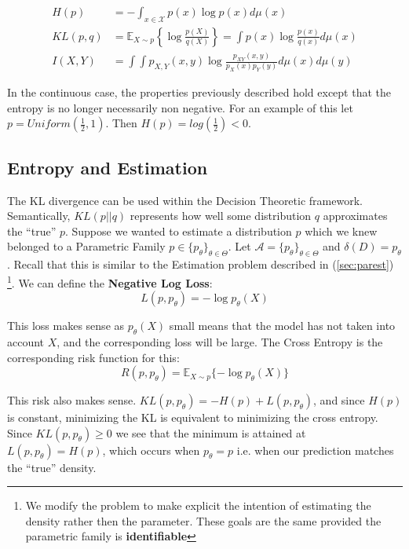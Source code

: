 \documentclass[]{article}
\theoremstyle{mattstyle}
\theoremstyle{definition}
\begin{document}
\begin{align}
H(p) &= -\int_{x\in\mathcal{X}}p(x)\log p(x)d\mu(x) \\
KL(p,q) &= \mathbb{E}_{X\sim p}\left\{\log \frac{p(X)}{q(X)}\right\} = \int p(x)\log\frac{p(x)}{q(x)}d\mu(x)\\
I(X,Y) &=\int\int p_{X,Y}(x,y)\log\frac{p_{XY}(x,y)}{p_X(x)p_Y(y)}d\mu(x)d\mu(y)
\end{align}

In the continuous case, the properties previously described hold except that the entropy is no longer necessarily non negative. For an example of this let $p = Uniform\left(\frac{1}{2},1\right)$. Then $H(p) = log(\frac{1}{2}) < 0$.

\subsection{Entropy and Estimation}\label{sec:entropyest}

The KL divergence can be used within the Decision Theoretic framework. Semantically, $KL(p||q)$ represents how well some distribution $q$ approximates the ``true'' $p$. Suppose we wanted to estimate a distribution $p$ which we knew belonged to a Parametric Family  $p\in \{p_{\theta}\}_{\theta\in\Theta}$. Let \(\mathcal{A} = \{p_{\theta}\}_{\theta\in\Theta}\) and $\delta(D)=p_{\theta}$. Recall that this is similar to the Estimation problem described in (\ref{sec:parest}) \footnote{We modify the problem to make explicit the intention of estimating the density rather then the parameter. These goals are the same provided the parametric family is \textbf{identifiable}}.  We can define the \textbf{Negative Log Loss}:
\begin{equation}
L(p,p_{\theta}) = -\log p_{\theta}(X)
\end{equation}

This loss makes sense as $p_{\theta}(X)$ small means that the model has not taken into account $X$, and the corresponding loss will be large. The Cross Entropy is the corresponding risk function for this:
\begin{equation}\label{eq:celf}
R(p,p_{\theta}) = \mathbb{E}_{X\sim p}\{ -\log p_{\theta}(X) \}
\end{equation}	

This risk also makes sense. $KL(p,p_{\theta}) = -H(p) + L(p,p_{\theta})$, and since $H(p)$ is constant, minimizing the KL is equivalent to minimizing the cross entropy. Since $KL(p,p_{\theta}) \ge 0$ we see that the minimum is attained at $L(p,p_{\theta}) = H(p)$, which occurs when $p_{\theta}=p$ i.e. when our prediction matches the ``true'' density.
\end{document}
